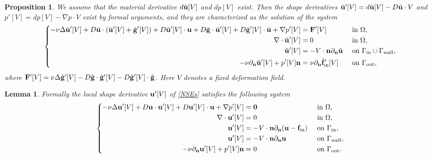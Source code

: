 \documentclass[oneside,11pt]{book}
\numberwithin{equation}{section}
\newtheorem{lemma}{Lemma}[section]
\newtheorem{proposition}{Proposition}[section]
\begin{document}
\begin{proposition}
    We assume that the material derivative $d\hat{\bf u}[V]$ and $dp[V]$ exist. Then the shape derivatives $\hat{\bf u}'[V] = d\hat{\bf u}[V] - D\hat{\bf u}\cdot V$ and $p'[V] = dp[V] - \nabla p\cdot V$ exist by formal arguments, and they are characterized as the solution of the system
    \begin{equation*}
        \left\{\begin{split}
            -\nu\Delta\hat{\bf u}'[V] + D\hat{\bf u}\cdot(\hat{\bf u}'[V] + \hat{\bf g}'[V]) + D\hat{\bf u}'[V]\cdot{\bf u} + D\hat{\bf g}\cdot\hat{\bf u}'[V] + D\hat{\bf g}'[V]\cdot\hat{\bf u} + \nabla p'[V] &= {\bf F}'[V] &&\mbox{ in } \Omega,\\
            \nabla\cdot\hat{\bf u}'[V] &= 0 &&\mbox{ in } \Omega,\\
            \hat{\bf u}'[V] &= -V\cdot{\bf n}\partial_{\bf n}\hat{\bf u} &&\mbox{ on } \Gamma_{\rm in}\cup\Gamma_{\rm wall},\\
            -\nu\partial_{\bf n}\hat{\bf u}'[V] + p'[V]{\bf n} &= \nu\partial_{\bf n}\hat{\bf f}_{\rm in}'[V] &&\mbox{ on } \Gamma_{\rm out},
        \end{split}\right.
    \end{equation*}
    where ${\bf F}'[V] = \nu\Delta\hat{\bf g}'[V] - D\hat{\bf g}\cdot\hat{\bf g}'[V] - D\hat{\bf g}'[V]\cdot\hat{\bf g}$. Here $V$ denotes a fixed deformation field.
\end{proposition}


\begin{lemma}
    Formally the local shape derivative ${\bf u}'[V]$ of \eqref{NSEs} satisfies the following system
    \begin{equation}
        \label{PDE for u', p'}
        \left\{\begin{split}
            -\nu\Delta{\bf u}'[V] + D{\bf u}\cdot{\bf u}'[V] + D{\bf u}'[V]\cdot{\bf u} + \nabla p'[V] &= {\bf 0} &&\mbox{ in } \Omega,\\
            \nabla\cdot{\bf u}'[V] &= 0 &&\mbox{ in } \Omega,\\
            {\bf u}'[V] &= -V\cdot{\bf n}\partial_{\bf n}({\bf u} - {\bf f}_{\rm in}) &&\mbox{ on } \Gamma_{\rm in},\\
            {\bf u}'[V] &= -V\cdot{\bf n}\partial_{\bf n}{\bf u} &&\mbox{ on } \Gamma_{\rm wall},\\
            -\nu\partial_{\bf n}{\bf u}'[V] + p'[V]{\bf n} &= 0 &&\mbox{ on } \Gamma_{\rm out}.
        \end{split}\right.
    \end{equation}
\end{lemma}
\end{document}
